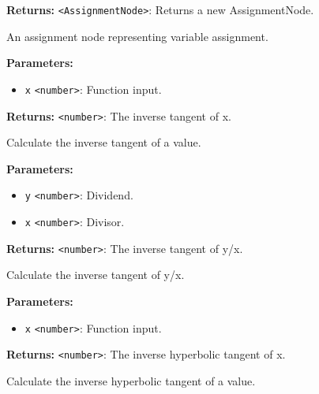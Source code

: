 \documentclass[12pt,a4paper]{article}
\begin{document}
\noindent \textbf{Returns:} \texttt{<AssignmentNode>}: Returns a new AssignmentNode.

\noindent An assignment node representing variable assignment.

\vspace{5mm}
\noindent {}


\noindent \textbf{Parameters:}
\begin{itemize}
  \item \texttt{x} \texttt{<number>}: Function input.
\end{itemize}

\noindent \textbf{Returns:} \texttt{<number>}: The inverse tangent of \textasciigrave{}x\textasciigrave{}.

\noindent Calculate the inverse tangent of a value.

\vspace{5mm}
\noindent {}


\noindent \textbf{Parameters:}
\begin{itemize}
  \item \texttt{y} \texttt{<number>}: Dividend.
  \item \texttt{x} \texttt{<number>}: Divisor.
\end{itemize}

\noindent \textbf{Returns:} \texttt{<number>}: The inverse tangent of \textasciigrave{}y/x\textasciigrave{}.

\noindent Calculate the inverse tangent of \textasciigrave{}y/x\textasciigrave{}.

\vspace{5mm}
\noindent {}


\noindent \textbf{Parameters:}
\begin{itemize}
  \item \texttt{x} \texttt{<number>}: Function input.
\end{itemize}

\noindent \textbf{Returns:} \texttt{<number>}: The inverse hyperbolic tangent of \textasciigrave{}x\textasciigrave{}.

\noindent Calculate the inverse hyperbolic tangent of a value.
\end{document}

